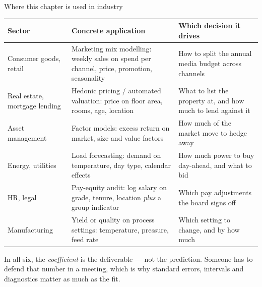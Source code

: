 \documentclass[aspectratio=169,11pt]{beamer}
\begin{document}
\begin{frame}{Where this chapter is used in industry}
  \scriptsize
  \begin{center}
  \begin{tabular}{@{}p{2.85cm}p{5.15cm}p{4.6cm}@{}}
    \toprule
    \textbf{Sector} & \textbf{Concrete application} & \textbf{Which decision it drives} \\
    \midrule
    Consumer goods, retail & Marketing mix modelling: weekly sales on spend per channel, price, promotion, seasonality & How to split the annual media budget across channels \\
    Real estate, mortgage lending & Hedonic pricing / automated valuation: price on floor area, rooms, age, location & What to list the property at, and how much to lend against it \\
    Asset management & Factor models: excess return on market, size and value factors & How much of the market move to hedge away \\
    Energy, utilities & Load forecasting: demand on temperature, day type, calendar effects & How much power to buy day-ahead, and what to bid \\
    HR, legal & Pay-equity audit: log salary on grade, tenure, location \emph{plus} a group indicator & Which pay adjustments the board signs off \\
    Manufacturing & Yield or quality on process settings: temperature, pressure, feed rate & Which setting to change, and by how much \\
    \bottomrule
  \end{tabular}
  \end{center}
  \vspace{2pt}
  \begin{industry}
    In all six, the \emph{coefficient} is the deliverable --- not the
    prediction. Someone has to defend that number in a meeting, which is
    why standard errors, intervals and diagnostics matter as much as the fit.
  \end{industry}
\end{frame}
\end{document}
